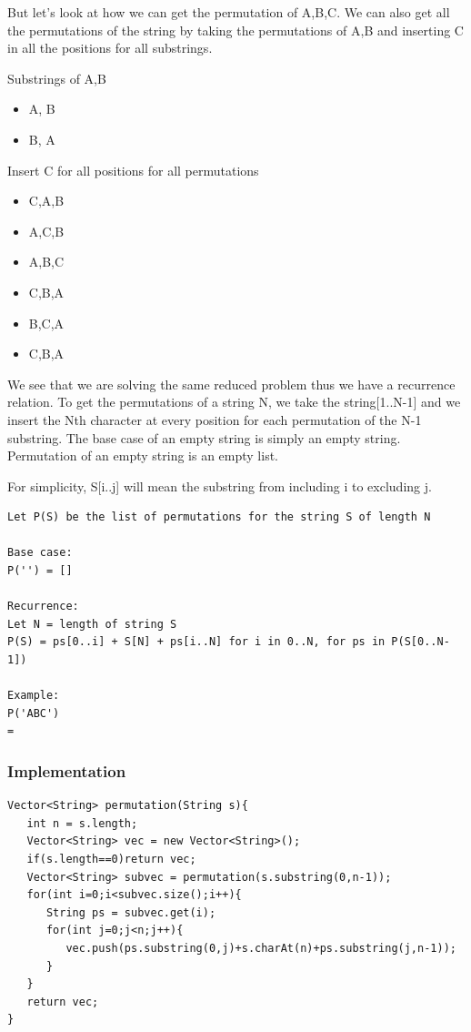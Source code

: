 \documentclass[11pt,oneside]{book}
\begin{document}
But let's look at how we can get the permutation of A,B,C. We can also get all the permutations of the string by taking the permutations of A,B and inserting C in all the positions for all substrings.

Substrings of A,B

\begin{itemize}
\item A, B
\item B, A
\end{itemize}

Insert C for all positions for all permutations

\begin{itemize}
\item C,A,B
\item A,C,B
\item A,B,C
\item C,B,A
\item B,C,A
\item C,B,A
\end{itemize}

We see that we are solving the same reduced problem thus we have a recurrence relation. To get the permutations of a string N, we take the string[1..N-1] and we insert the Nth character at every position for each permutation of the N-1 substring. The base case of an empty string is simply an empty string. Permutation of an empty string is an empty list.

For simplicity, S[i..j] will mean the substring from including i to excluding j.

\begin{lstlisting}
Let P(S) be the list of permutations for the string S of length N

Base case:
P('') = []

Recurrence:
Let N = length of string S
P(S) = ps[0..i] + S[N] + ps[i..N] for i in 0..N, for ps in P(S[0..N-1])

Example:
P('ABC')
=

\end{lstlisting}

\subsubsection{Implementation}

\begin{lstlisting}
Vector<String> permutation(String s){
   int n = s.length;
   Vector<String> vec = new Vector<String>();
   if(s.length==0)return vec;
   Vector<String> subvec = permutation(s.substring(0,n-1));
   for(int i=0;i<subvec.size();i++){
      String ps = subvec.get(i);
      for(int j=0;j<n;j++){
         vec.push(ps.substring(0,j)+s.charAt(n)+ps.substring(j,n-1));
      }
   }
   return vec;
}
\end{lstlisting}
\end{document}
